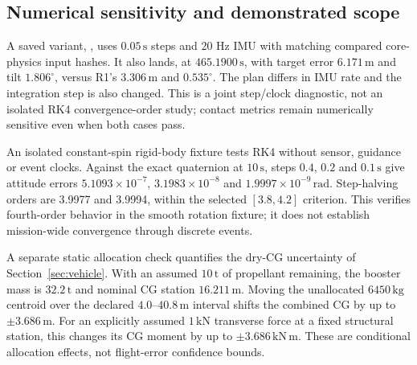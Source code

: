 \subsection{Numerical sensitivity and demonstrated scope}
A saved variant, , uses $0.05\,\mathrm{s}$ steps and 20 Hz IMU with matching compared core-physics input hashes. It also lands, at $465.1900\,\mathrm{s}$, with target error $6.171\,\mathrm{m}$ and tilt $1.806^\circ$, versus R1's $3.306\,\mathrm{m}$ and $0.535^\circ$. The plan differs in IMU rate and the integration step is also changed. This is a joint step/clock diagnostic, not an isolated RK4 convergence-order study; contact metrics remain numerically sensitive even when both cases pass.

An isolated constant-spin rigid-body fixture tests RK4 without sensor, guidance or event clocks. Against the exact quaternion at $10\,\mathrm{s}$, steps $0.4$, $0.2$ and $0.1\,\mathrm{s}$ give attitude errors $5.1093\times10^{-7}$, $3.1983\times10^{-8}$ and $1.9997\times10^{-9}\,\mathrm{rad}$. Step-halving orders are 3.9977 and 3.9994, within the selected $[3.8,4.2]$ criterion. This verifies fourth-order behavior in the smooth rotation fixture; it does not establish mission-wide convergence through discrete events.

A separate static allocation check quantifies the dry-CG uncertainty of Section~\ref{sec:vehicle}. With an assumed $10\,\mathrm{t}$ of propellant remaining, the booster mass is $32.2\,\mathrm{t}$ and nominal CG station $16.211\,\mathrm{m}$. Moving the unallocated $6450\,\mathrm{kg}$ centroid over the declared $4.0$--$40.8\,\mathrm{m}$ interval shifts the combined CG by up to $\pm3.686\,\mathrm{m}$. For an explicitly assumed $1\,\mathrm{kN}$ transverse force at a fixed structural station, this changes its CG moment by up to $\pm3.686\,\mathrm{kN\,m}$. These are conditional allocation effects, not flight-error confidence bounds.
